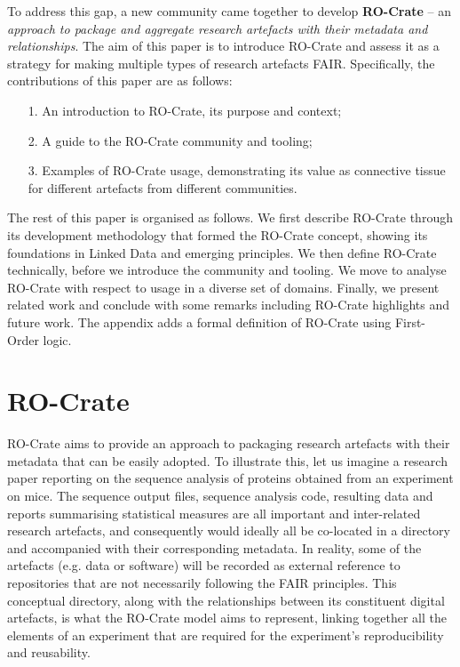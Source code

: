 \documentclass[ds,v1.1.2,openaccess]{iosart2x}%
\begin{document}
To address this gap, a new community came together
\cite{doi:10.5281/zenodo.3250687} to develop \textbf{RO-Crate} -- an \textit{approach
to package and aggregate research artefacts with their metadata and
relationships}. The aim of this paper is to introduce RO-Crate and
assess it as a strategy for making multiple types of research artefacts
FAIR. Specifically, the contributions of this paper are as follows:
%
\begin{enumerate}
\item[1.] An introduction to RO-Crate, its purpose and context;
\item[2.] A guide to the RO-Crate community and tooling;
\item[3.] Examples of RO-Crate usage, demonstrating its value as connective
tissue for different artefacts from different communities.
\end{enumerate}

The rest of this paper is organised as follows. We first describe
RO-Crate through its development methodology that formed the RO-Crate
concept, showing its foundations in Linked Data and emerging
principles. We then define RO-Crate technically, before we introduce
the community and tooling. We move to analyse RO-Crate with respect to
usage in a diverse set of domains. Finally, we present related work and
conclude with some remarks including RO-Crate highlights and future
work. The appendix adds a formal definition of RO-Crate using
First-Order logic.

\section{RO-Crate} %

\label{sec:rocrate}

RO-Crate aims to provide an approach to packaging research artefacts
with their metadata that can be easily adopted. To illustrate this, let
us imagine a research paper reporting on the sequence analysis of
proteins obtained from an experiment on mice. The sequence output
files, sequence analysis code, resulting data and reports summarising
statistical measures are all important and inter-related research
artefacts, and consequently would ideally all be co-located in a
directory and accompanied with their corresponding metadata. In
reality, some of the artefacts (e.g. data or software) will be recorded
as external reference to repositories that are not necessarily
following the FAIR principles. This conceptual directory, along with
the relationships between its constituent digital artefacts, is what
the RO-Crate model aims to represent, linking together all the elements
of an experiment that are required for the experiment's reproducibility
and reusability.
\end{document}
